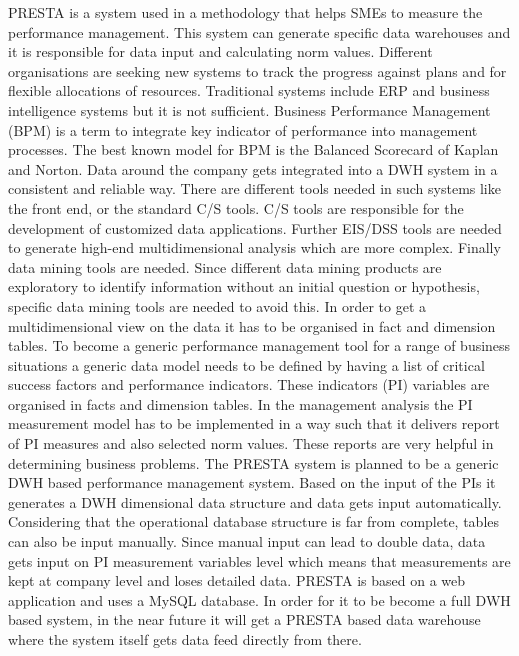 \documentclass[../paper.tex]{subfiles}
\begin{document}
PRESTA is a system used in a methodology that helps SMEs to measure the performance management. This system can generate specific data warehouses and it is responsible for data input and calculating norm values. Different organisations are seeking new systems to track the progress against plans and for flexible allocations of resources. Traditional systems include ERP and business intelligence systems but it is not sufficient. Business Performance Management (BPM) is a term to integrate key indicator of performance into management processes. The best known model for BPM is the Balanced Scorecard of Kaplan and Norton. Data around the company gets integrated into a DWH system in a consistent and reliable way. There are different tools needed in such systems like the front end, or the standard C/S tools. C/S tools are responsible for the development of customized data applications. Further EIS/DSS tools are needed to generate high-end multidimensional analysis which are more complex. Finally data mining tools are needed. Since different data mining products are exploratory to identify information without an initial question or hypothesis, specific data mining tools are needed to avoid this. In order to get a multidimensional view on the data it has to be organised in fact and dimension tables. To become a generic performance management tool for a range of business situations a generic data model needs to be defined by having a list of critical success factors and performance indicators. These indicators (PI) variables are organised in facts and dimension tables. In the management analysis the PI measurement model has to be implemented in a way such that it delivers report of PI measures and also selected norm values. These reports are very helpful in determining business problems. The PRESTA system is planned to be a generic DWH based performance management system. Based on the input of the PIs it generates a DWH dimensional data structure and data gets input automatically. Considering that the operational database structure is far from complete, tables can also be input manually. Since manual input can lead to double data, data gets input on PI measurement variables level which means that measurements are kept at company level and loses detailed data. PRESTA is based on a web application and uses a MySQL database. In order for it to be become a full DWH based system, in the near future it will get a PRESTA based data warehouse where the system itself gets data feed directly from there.
\end{document}
